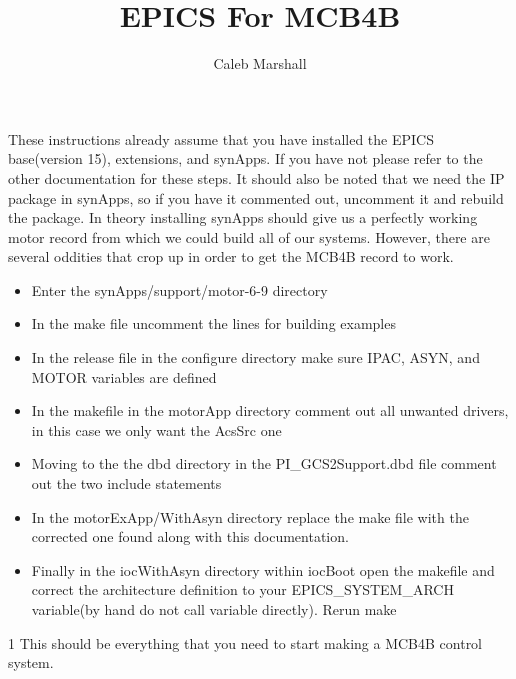 \documentclass{article}
\begin{document}
 



\title{EPICS For MCB4B}
\date{}
\author{Caleb Marshall}
\maketitle

  These instructions already assume that you have installed the EPICS base(version 15), extensions, and synApps. If you have not please refer to
the other documentation for these steps. It should also be noted that we need the IP package in synApps, so if you have it commented out, uncomment it and 
rebuild the package. In theory installing synApps should give us a perfectly working motor record from which we could build all of our systems. However, 
there are several oddities that crop up in order to get the MCB4B record to work. 


 
\begin{itemize}
  \item Enter the synApps/support/motor-6-9 directory
  \item In the make file uncomment the lines for building examples
  \item In the release file in the configure directory make sure IPAC, ASYN, and MOTOR variables are defined
  \item In the makefile in the motorApp directory comment out all unwanted drivers, in this case we only want the AcsSrc one
  \item Moving to the the dbd directory in the PI\_GCS2Support.dbd file comment out the two include statements
  \item In the motorExApp/WithAsyn directory replace the make file with the corrected one found along with this documentation.
  \item Finally in the iocWithAsyn directory within iocBoot open the makefile and correct the architecture definition to your EPICS_SYSTEM_ARCH variable(by hand do not call variable directly). Rerun make 
\end{itemize}  
  
1
This should be everything that you need to start making a MCB4B control system.
 
 

 
 
\end{document}
